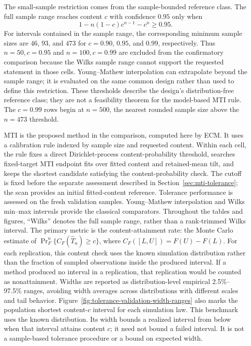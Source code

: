 \documentclass[11pt]{article}
\numberwithin{equation}{section}
\begin{document}
The small-sample restriction comes from the sample-bounded reference class.
The full sample range reaches content \(c\) with confidence
\(0.95\) only when
\[
  1-n(1-c)c^{n-1}-c^n \ge 0.95 .
\]
For intervals contained in the sample range, the corresponding minimum sample
sizes are \(46\), \(93\), and \(473\) for
\(c=0.90\), \(0.95\), and \(0.99\), respectively. Thus
\(n=50,c=0.95\) and \(n=100,c=0.99\) are excluded from the confirmatory
comparison because the Wilks sample range cannot
support the requested statement in those cells. Young--Mathew interpolation
can extrapolate beyond the sample range; it is evaluated on the same common
design rather than used to define this restriction. These thresholds describe the
design's distribution-free reference class; they are not a feasibility theorem
for the model-based MTI rule. The \(c=0.99\) rows begin at \(n=500\), the
nearest rounded sample size above the \(n=473\) threshold.

MTI is the proposed method in the comparison, computed here by ECM. It uses a calibration rule indexed
by sample size and requested content. Within each cell, the rule fixes a direct
Dirichlet-process content-probability threshold, searches
fixed-target MTI endpoint fits over fitted content and retained-mean tilt,
and keeps the shortest candidate satisfying the content-probability check.
The cutoff is fixed before the separate assessment described in
Section~\ref{sec:mti-tolerance}; the scan provides an initial fitted-content
reference. Tolerance performance is assessed on the fresh validation samples.
Young--Mathew interpolation
\citep{YoungMathew2014NonparametricTolerance} and Wilks min--max intervals
\citep{Wilks1941ToleranceLimits,Wilks1942StatisticalPrediction} provide the
classical comparators. Throughout the tables and figures, ``Wilks'' denotes
the full sample range, rather than a rank-trimmed Wilks interval.
The primary metric is the
content-attainment rate: the Monte Carlo estimate of
\(\Pr_F^n\{C_F(\widehat T_n)\ge c\}\), where
\(C_F([L,U])=F(U)-F(L)\). For each replication, this content check uses the
known simulation distribution rather than the fraction of sampled observations
inside the produced interval. If a method produced no interval in a replication,
that replication would be counted as nonattainment. Widths are reported as
distribution-level empirical 2.5\%--97.5\% ranges, avoiding width averages
across distributions with different scales and tail behavior.
Figure~\ref{fig:tolerance-validation-width-ranges} also marks the population
shortest content-\(c\) interval for each simulation law. This benchmark uses
the known distribution. Its width bounds a realized interval from below
when that interval attains content \(c\); it need not bound a failed interval.
It is not a sample-based tolerance procedure or a bound on expected width.
\end{document}
